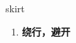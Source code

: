 
\begin{frame}
{\huge skirt}
\begin{center}
\begin{enumerate}\Large
  \item \textbf{绕行，避开}
\end{enumerate}
\end{center}
\end{frame}
